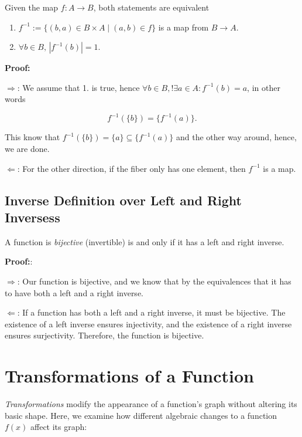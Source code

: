 Given the map \(f: A \to B\), both statements are equivalent 

\begin{enumerate}

	\item \(f^{-1}:= \{(b, a) \in B \times A \mid (a, b) \in f\}\) is a map from \(B \to A\).

	\item  \(\forall b \in B, \, |f^{-1}(b)| = 1\).

\end{enumerate}

\textbf{Proof:}

\(\Rightarrow\): We assume that 1. is true, hence \(\forall b \in B, !\exists a \in A: f^{-1}(b) = a\), in other words 

\[
	f^{-1}(\{b\}) = \{f^{-1}(a)\}.
\]

This  know that \(f^{-1}(\{b\}) = \{a\} \subseteq \{f^{-1}(a)\}\) and the other way around, hence, we are done.

\(\Leftarrow\): For the other direction, if the fiber only has one element, then \(f^{-1}\) is a map.

\QED

\subsection{Inverse Definition over Left and Right Inversess}

A function is \emph{bijective} (invertible) is and only if it has a left and right inverse.

\textbf{Proof:}:

\(\Rightarrow\): Our function is bijective, and we know that by the equivalences that it has to have both a left and a right inverse.

\(\Leftarrow\): If a function has both a left and a right inverse, it must be bijective. The existence of a left inverse ensures injectivity, and the existence of a right inverse ensures surjectivity. Therefore, the function is bijective.

\QED

\section{Transformations of a Function}

\emph{Transformations} modify the appearance of a function's graph without altering its basic shape.
Here, we examine how different algebraic changes to a function \( f(x) \) affect its graph:

